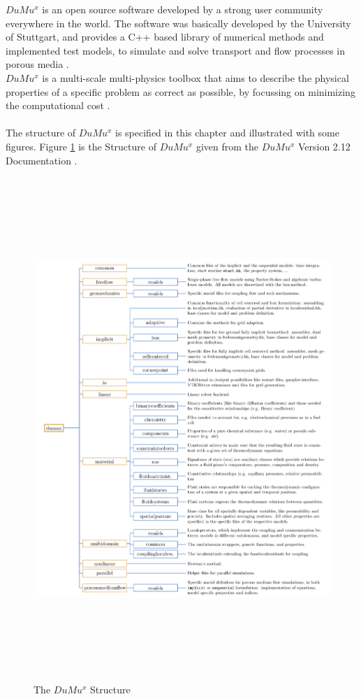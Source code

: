 $DuMu^x$ is an open source software developed by a strong user community everywhere in the world. The software was basically developed by the University of Stuttgart, and provides a C++ based library of numerical methods and implemented test models, to simulate and solve transport and flow processes in porous media \cite{flemisch2007dumux}.
\\$DuMu^x$ is a multi-scale multi-physics toolbox that aims to describe the physical properties of a specific problem as correct as possible, by focussing on minimizing the computational cost \cite{flemisch2007dumux}.\\
\\The structure of $DuMu^x$ is specified in this chapter and illustrated with some figures.
Figure \ref{fig:dumux_structure}  is the Structure of $DuMu^x$ given from the $DuMu^x$ Version 2.12 Documentation \cite{flemischdumux}.\\
\begin{figure}[p]
\centering
\includegraphics[height=190mm]{dumux_structure}
\caption{\footnotesize The $DuMu^x$ Structure}
\label{fig:dumux_structure}
\end{figure}\\\\

